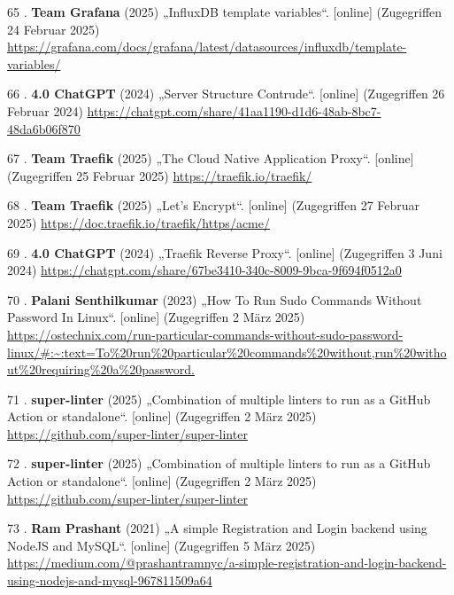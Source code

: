 \documentclass[
    headings=optiontotocandhead,%
    twoside,
    numbers=noenddot,%
    12pt, %
    titlepage, %
    parskip=full, %
    listof=leveldown, 
    numbers=noenddot, %
    a4paper,DIV=14,
    BCOR=15mm,
]{scrbook}
\newlength{\cslhangindent}
\newenvironment{cslreferences}%
  {\setlength{\parindent}{0pt}%
  \everypar{\setlength{\hangindent}{\cslhangindent}}\ignorespaces}%
  {\par}
\begin{document}
\begin{cslreferences}
\leavevmode\hypertarget{ref-grafana-variables}{}%
65 . \textbf{Team Grafana} (2025) „InfluxDB template variables``.
{[}online{]} (Zugegriffen 24 Februar 2025)
\url{https://grafana.com/docs/grafana/latest/datasources/influxdb/template-variables/}

\leavevmode\hypertarget{ref-gpt-server-structure}{}%
66 . \textbf{4.0 ChatGPT} (2024) „Server Structure Contrude``.
{[}online{]} (Zugegriffen 26 Februar 2024)
\url{https://chatgpt.com/share/41aa1190-d1d6-48ab-8bc7-48da6b06f870}

\leavevmode\hypertarget{ref-traefik-overview}{}%
67 . \textbf{Team Traefik} (2025) „The Cloud Native Application Proxy``.
{[}online{]} (Zugegriffen 25 Februar 2025)
\url{https://traefik.io/traefik/}

\leavevmode\hypertarget{ref-traefik-lets-encrypt}{}%
68 . \textbf{Team Traefik} (2025) „Let's Encrypt``. {[}online{]}
(Zugegriffen 27 Februar 2025)
\url{https://doc.traefik.io/traefik/https/acme/}

\leavevmode\hypertarget{ref-gpt-traefik}{}%
69 . \textbf{4.0 ChatGPT} (2024) „Traefik Reverse Proxy``. {[}online{]}
(Zugegriffen 3 Juni 2024)
\url{https://chatgpt.com/share/67be3410-340c-8009-9bca-9f694f0512a0}

\leavevmode\hypertarget{ref-sudo-no-pass}{}%
70 . \textbf{Palani Senthilkumar} (2023) „How To Run Sudo Commands
Without Password In Linux``. {[}online{]} (Zugegriffen 2 März 2025)
\url{https://ostechnix.com/run-particular-commands-without-sudo-password-linux/\#:~:text=To\%20run\%20particular\%20commands\%20without,run\%20without\%20requiring\%20a\%20password.}

\leavevmode\hypertarget{ref-superlinter}{}%
71 . \textbf{super-linter} (2025) „Combination of multiple linters to
run as a GitHub Action or standalone``. {[}online{]} (Zugegriffen 2 März
2025) \url{https://github.com/super-linter/super-linter}

\leavevmode\hypertarget{ref-influxdb-javascript}{}%
72 . \textbf{super-linter} (2025) „Combination of multiple linters to
run as a GitHub Action or standalone``. {[}online{]} (Zugegriffen 2 März
2025) \url{https://github.com/super-linter/super-linter}

\leavevmode\hypertarget{ref-medium-auth-mysql}{}%
73 . \textbf{Ram Prashant} (2021) „A simple Registration and Login
backend using NodeJS and MySQL``. {[}online{]} (Zugegriffen 5 März 2025)
\url{https://medium.com/@prashantramnyc/a-simple-registration-and-login-backend-using-nodejs-and-mysql-967811509a64}


\end{cslreferences}
\end{document}
